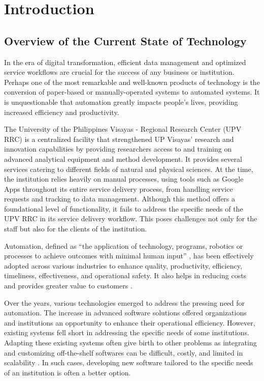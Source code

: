 \chapter{Introduction}
\label{sec:researchdesc}    %

\section{Overview of the Current State of Technology}
\label{sec:overview}


In the era of digital transformation, efficient data management and optimized service workflows are crucial for the success of any business or institution. Perhaps one of the most remarkable and well-known products of technology is the conversion of paper-based or manually-operated systems to automated systems. It is unquestionable that automation greatly impacts people's lives, providing increased efficiency and productivity.

The University of the Philippines Visayas - Regional Research Center (UPV RRC) is a centralized facility that strengthened UP Visayas’ research and innovation capabilities by providing researchers access to and training on advanced analytical equipment and method development. It provides several services catering to different fields of natural and physical sciences. At the time, the institution relies heavily on manual processes, using tools such as Google Apps throughout its entire service delivery process, from handling service requests and tracking to data management. Although this method offers a foundational level of functionality, it fails to address the specific needs of the UPV RRC in its service delivery workflow. This poses challenges not only for the staff but also for the clients of the institution.

Automation, defined as “the application of technology, programs, robotics or processes to achieve outcomes with minimal human input” \cite{ibm}, has been effectively adopted across various industries to enhance quality, productivity, efficiency, timeliness, effectiveness, and operational safety. It also helps in reducing costs and provides greater value to customers \cite{caban2021}. 

Over the years, various technologies emerged to address the pressing need for automation. The increase in advanced software solutions offered organizations and institutions an opportunity to enhance their operational efficiency. However, existing systems fell short in addressing the specific needs of some institutions. Adapting these existing systems often give birth to other problems as integrating and customizing off-the-shelf softwares can be difficult, costly, and limited in scalability \cite{bitcat2023}. In such cases, developing new software tailored to the specific needs of an institution is often a better option.

